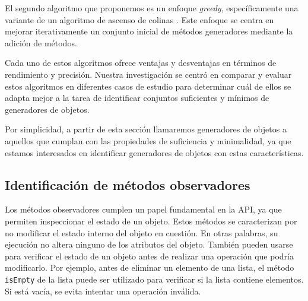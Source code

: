 El segundo algoritmo que proponemos es un enfoque \emph{greedy}, específicamente una variante de un algoritmo de ascenso de colinas \cite{Russell:2009,Cormen2009}. Este enfoque se centra en mejorar iterativamente un conjunto inicial de métodos generadores mediante la adición de métodos.


Cada uno de estos algoritmos ofrece ventajas y desventajas en términos de rendimiento y precisión. Nuestra investigación se centró en comparar y evaluar estos algoritmos en diferentes casos de estudio para determinar cuál de ellos se adapta mejor a la tarea de identificar conjuntos suficientes y mínimos de generadores de objetos.


Por simplicidad, a partir de esta sección llamaremos generadores de objetos a aquellos que cumplan con las propiedades de suficiencia y minimalidad, ya que estamos interesados en identificar generadores de objetos con estas características.


\subsection{Identificación de métodos observadores}

 Los métodos observadores cumplen un papel fundamental en la API, ya que permiten inspeccionar el estado de un objeto. Estos métodos se caracterizan por no modificar el estado interno del objeto en cuestión. En otras palabras, su ejecución no altera ninguno de los atributos del objeto.
  También pueden usarse para verificar el estado de un objeto antes de realizar una operación que podría modificarlo.
 Por ejemplo, antes de eliminar un elemento de una lista, el método \texttt{isEmpty} de la lista puede ser utilizado para verificar si la lista contiene elementos. Si está vacía, se evita intentar una operación inválida.

